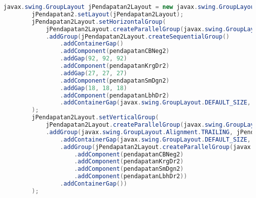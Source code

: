 \begin{lstlisting}[language=Java, caption=TampilanKondisiKetetanggaan.java]
        javax.swing.GroupLayout jPendapatan2Layout = new javax.swing.GroupLayout(jPendapatan2);
        jPendapatan2.setLayout(jPendapatan2Layout);
        jPendapatan2Layout.setHorizontalGroup(
            jPendapatan2Layout.createParallelGroup(javax.swing.GroupLayout.Alignment.LEADING)
            .addGroup(jPendapatan2Layout.createSequentialGroup()
                .addContainerGap()
                .addComponent(pendapatanCBNeg2)
                .addGap(92, 92, 92)
                .addComponent(pendapatanKrgDr2)
                .addGap(27, 27, 27)
                .addComponent(pendapatanSmDgn2)
                .addGap(18, 18, 18)
                .addComponent(pendapatanLbhDr2)
                .addContainerGap(javax.swing.GroupLayout.DEFAULT_SIZE, Short.MAX_VALUE))
        );
        jPendapatan2Layout.setVerticalGroup(
            jPendapatan2Layout.createParallelGroup(javax.swing.GroupLayout.Alignment.LEADING)
            .addGroup(javax.swing.GroupLayout.Alignment.TRAILING, jPendapatan2Layout.createSequentialGroup()
                .addContainerGap(javax.swing.GroupLayout.DEFAULT_SIZE, Short.MAX_VALUE)
                .addGroup(jPendapatan2Layout.createParallelGroup(javax.swing.GroupLayout.Alignment.BASELINE)
                    .addComponent(pendapatanCBNeg2)
                    .addComponent(pendapatanKrgDr2)
                    .addComponent(pendapatanSmDgn2)
                    .addComponent(pendapatanLbhDr2))
                .addContainerGap())
        );


\end{lstlisting}
